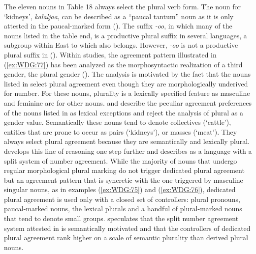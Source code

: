 \documentclass[output=collectionpaper]{langsci/langscibook}
\begin{document}
The eleven nouns in Table 18 always select the plural verb form. The noun for `kidneys', \textit{kalaljaa}, can be described as a ``paucal tantum'' noun as it is only attested in the paucal-marked form (\citealt[9]{Corbett1987}). The suffix \textit{-oo}, in which many of the nouns listed in the table end, is a productive plural suffix in several  languages, a subgroup within East  to which  also belongs. However, \textit{-oo} is not a productive plural suffix in  (\citealt[19]{Corbett1987}). Within  studies, the agreement pattern illustrated in (\ref{ex:WDG:77}) has been analyzed as the morphosyntactic realization of a third gender, the plural gender (\citealt[146]{Mous2008}). The analysis is motivated by the fact that the nouns listed in  select plural agreement even though they are morphologically underived for number. For these nouns, plurality is a lexically specified feature as masculine and feminine are for other nouns. \cite{Corbett1987} and \cite{Corbett2012} describe the peculiar agreement preferences of the nouns listed in  as lexical exceptions and reject the analysis of plural as a gender value. Semantically these nouns tend to denote collectives (`cattle'), entities that are prone to occur as pairs (`kidneys'), or masses (`meat'). They always select plural agreement because they are semantically and lexically plural. \cite[121--127]{DiGarbo2014} develops this line of reasoning one step further and describes  as a language with a split system of number agreement. While the majority of nouns that undergo regular morphological plural marking do not trigger dedicated plural agreement but an agreement pattern that is syncretic with the one triggered by masculine singular nouns, as in examples (\ref{ex:WDG:75}) and (\ref{ex:WDG:76}), dedicated plural agreement is used only with a closed set of controllers: plural pronouns, paucal-marked nouns, the lexical plurals and a handful of plural-marked nouns that tend to denote small groups. \cite{DiGarbo2014} speculates that the split number agreement system attested in  is semantically motivated and that the controllers of dedicated plural agreement rank higher on a scale of semantic plurality than derived plural nouns.
\end{document}
